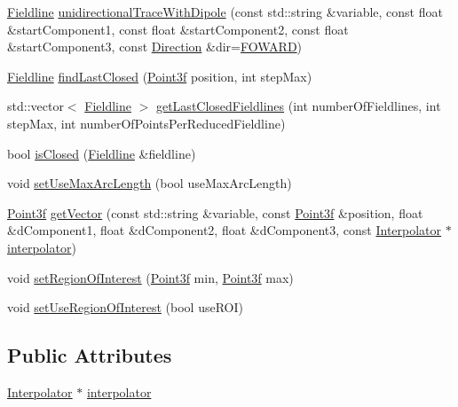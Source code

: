 \begin{DoxyCompactItemize}
\item 
\hyperlink{classccmc_1_1_fieldline}{Fieldline} \hyperlink{classccmc_1_1_tracer_a5f271069b9f92eafb9db48893ef19128}{unidirectional\-Trace\-With\-Dipole} (const std\-::string \&variable, const float \&start\-Component1, const float \&start\-Component2, const float \&start\-Component3, const \hyperlink{classccmc_1_1_tracer_a2c914b28e2e205cb1a7c01f2941fcae2}{Direction} \&dir=\hyperlink{classccmc_1_1_tracer_a2c914b28e2e205cb1a7c01f2941fcae2a133381f1178a2affb0f1c79a67b45e52}{F\-O\-W\-A\-R\-D})
\item 
\hyperlink{classccmc_1_1_fieldline}{Fieldline} \hyperlink{classccmc_1_1_tracer_a214b139e1f6a0a81f95745eb1b4ab0f2}{find\-Last\-Closed} (\hyperlink{classccmc_1_1_point3f}{Point3f} position, int step\-Max)
\item 
std\-::vector$<$ \hyperlink{classccmc_1_1_fieldline}{Fieldline} $>$ \hyperlink{classccmc_1_1_tracer_af8ed24a1334dbaa0cfbb024ef11ad8cb}{get\-Last\-Closed\-Fieldlines} (int number\-Of\-Fieldlines, int step\-Max, int number\-Of\-Points\-Per\-Reduced\-Fieldline)
\item 
bool \hyperlink{classccmc_1_1_tracer_aee62bc5b0bb724545d1fd32ae2af343f}{is\-Closed} (\hyperlink{classccmc_1_1_fieldline}{Fieldline} \&fieldline)
\item 
void \hyperlink{classccmc_1_1_tracer_aec22644edb73716c0be90a8aad3f9bdb}{set\-Use\-Max\-Arc\-Length} (bool use\-Max\-Arc\-Length)
\item 
\hyperlink{classccmc_1_1_point3f}{Point3f} \hyperlink{classccmc_1_1_tracer_a533ed52b1386402f83225c2fd81b8c40}{get\-Vector} (const std\-::string \&variable, const \hyperlink{classccmc_1_1_point3f}{Point3f} \&position, float \&d\-Component1, float \&d\-Component2, float \&d\-Component3, const \hyperlink{classccmc_1_1_interpolator}{Interpolator} $\ast$\hyperlink{classccmc_1_1_tracer_ae7a4953e9ca43eb93535b869864f6062}{interpolator})
\item 
void \hyperlink{classccmc_1_1_tracer_a1978e6bc32b29821fcd8d673182da7c9}{set\-Region\-Of\-Interest} (\hyperlink{classccmc_1_1_point3f}{Point3f} min, \hyperlink{classccmc_1_1_point3f}{Point3f} max)
\item 
void \hyperlink{classccmc_1_1_tracer_adeeddca01155c69abfdd85711e049568}{set\-Use\-Region\-Of\-Interest} (bool use\-R\-O\-I)
\end{DoxyCompactItemize}
\subsection*{Public Attributes}
\begin{DoxyCompactItemize}
\item 
\hyperlink{classccmc_1_1_interpolator}{Interpolator} $\ast$ \hyperlink{classccmc_1_1_tracer_ae7a4953e9ca43eb93535b869864f6062}{interpolator}
\end{DoxyCompactItemize}


